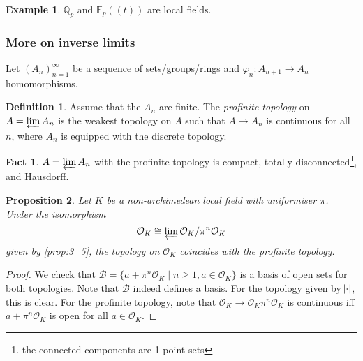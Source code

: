 \documentclass[11pt]{article}
\theoremstyle{definition}
\newtheorem{definition}{Definition}[subsection]
\newtheorem*{example}{Example}
\newtheorem*{fact}{Fact}
\theoremstyle{plain}
\newtheorem{proposition}[definition]{Proposition}
\theoremstyle{remark}
\newcommand{\bF}{\mathbb{F}}
\newcommand{\bQ}{\mathbb{Q}}
\newcommand{\cO}{\mathcal{O}}
\begin{document}
\begin{example}
    $\bQ_p$ and $\bF_p((t))$ are local fields.
\end{example}

\subsubsection*{More on inverse limits}
Let $(A_n)_{n=1}^\infty$ be a sequence of sets/groups/rings and $\varphi_n : A_{n+1} \to A_n$ homomorphisms.

\begin{definition}
    Assume that the $A_n$ are finite. The \emph{profinite topology} on $A = \varprojlim A_n$ is the weakest topology on $A$ such that $A \to A_n$ is continuous for all $n$, where $A_n$ is equipped with the discrete topology.
\end{definition}

\begin{fact}
    $A = \varprojlim A_n$ with the profinite topology is compact, totally disconnected\footnote{the connected components are 1-point sets}, and Hausdorff.
\end{fact}

\begin{proposition}\label{prop:7_4}
    Let $K$ be a non-archimedean local field with uniformiser $\pi$. Under the isomorphism
    \begin{equation*}
        \cO_K \cong \varprojlim \cO_K / \pi^n \cO_K
    \end{equation*}
    given by \autoref{prop:3_5}, the topology on $\cO_K$ coincides with the profinite topology.
\end{proposition}
\begin{proof}
    We check that $\mathcal{B} = \{a + \pi^n\cO_K \mid n \ge 1, a \in \cO_K\}$ is a basis of open sets for both topologies. Note that $\mathcal{B}$ indeed defines a basis. For the topology given by $\abs{\cdot}$, this is clear. For the profinite topology, note that $\cO_K \to \cO_K \pi^n \cO_K$ is continuous iff $a + \pi^n \cO_K$ is open for all $a \in \cO_K$.
\end{proof}
\end{document}

